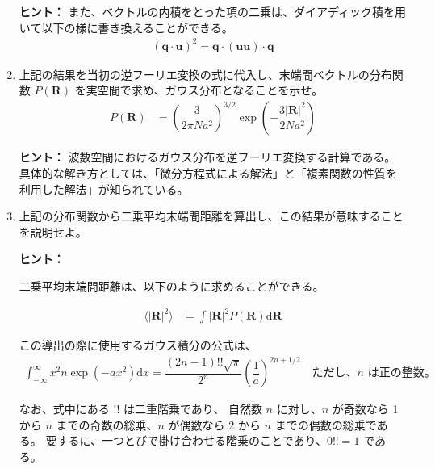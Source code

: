 \documentclass[uplatex,dvipdfmx,a4paper,11pt]{jsarticle}
\newcommand{\diff}{\mathrm d}
\begin{document}
\begin{enumerate}
\begin{itembox}[l]{{\bf ヒント：}}
また、ベクトルの内積をとった項の二乗は、ダイアディック積を用いて以下の様に書き換えることができる。
\begin{align*}
(\bm{q} \cdot \bm{u})^2 = \bm{q} \cdot (\bm{u} \bm{u}) \cdot \bm{q}
\end{align*}
\color{black}
\end{itembox}

\item
上記の結果を当初の逆フーリエ変換の式に代入し、末端間ベクトルの分布関数 $P(\bm{R})$ を実空間で求め、ガウス分布となることを示せ。
\begin{align*}
P(\bm{R}) 
	&= \left( \dfrac{3}{2 \pi N a^2} \right)^{3/2} \exp \left( -\dfrac{3|\bm{R}|^2}{2Na^2} \right)
\end{align*}



\begin{itembox}[l]{{\bf ヒント：}}
波数空間におけるガウス分布を逆フーリエ変換する計算である。
具体的な解き方としては、「微分方程式による解法」と「複素関数の性質を利用した解法」が知られている。
\end{itembox}


\item
上記の分布関数から二乗平均末端間距離を算出し、この結果が意味することを説明せよ。

\vspace{10pt}

\begin{itembox}[l]{{\bf ヒント：}}

二乗平均末端間距離は、以下のように求めることができる。

\begin{align*}
\langle |\bm{R}|^2 \rangle 
	&= \int |\bm{R}|^2 P(\bm{R}) \diff \bm{R} 
\end{align*}

この導出の際に使用するガウス積分の公式は、
\begin{align*}
\int_{-\infty}^{\infty} x^2n \exp(-ax^2) \diff x = \dfrac{(2n-1)!! \sqrt{\pi}}{2^n} \left( \dfrac{1}{a} \right)^{{2n+1}/{2}}\quad \text{ただし、$n$ は正の整数。}
\end{align*}


なお、式中にある $!!$ は二重階乗であり、 自然数 $n$ に対し、$n$ が奇数なら 1 から $n$ までの奇数の総乗、$n$ が偶数なら 2 から $n$ までの偶数の総乗である。
要するに、一つとびで掛け合わせる階乗のことであり、$0!! = 1$ である。

\end{itembox}


\end{enumerate}
\end{document}
